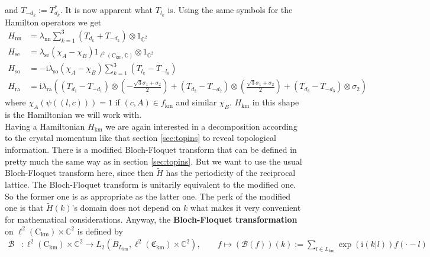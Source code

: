 and $T_{-d_{k}} := T_{d_{k}}^{\ast}$. It is now apparent what $T_{l_{k}}$ is. Using the same symbols for the Hamilton operators we get
\begin{align*}
  H_{\textrm{nn}}
  &=
  \lambda_{\textrm{nn}}
  \sum_{k=1}^{3}
  \left(
    T_{d_{k}}
    +
    T_{-d_{k}}
  \right)
  \otimes
  1_{\mathbb{C}^{2}}
  \\
  H_{\textrm{se}}
  &=
  \lambda_{\textrm{se}}
  (\chi_{A} - \chi_{B})
  1_{\ell^{2}(\mathrm{C}_{\textrm{km}},\mathbb{C})}
  \otimes
  1_{\mathbb{C}^{2}}
  \\
  H_{\textrm{so}}
  &=
  -
  \mathrm{i}
  \lambda_{\textrm{so}}
  (\chi_{A} - \chi_{B})
  \sum_{k=1}^{3}
  \left(
    T_{l_{k}}
    -
    T_{-l_{k}}
  \right)
  \\
  H_{\textrm{ra}}
  &=
  \mathrm{i}
  \lambda_{\textrm{ra}}
  \left(
    \left(
      T_{d_{1}}
      -
      T_{-d_{1}}
    \right)
    \otimes
    \left(
      -
      \frac{\sqrt{3}\sigma_{1} + \sigma_{2}}{2}
    \right)
    +
    \left(
      T_{d_{2}}
      -
      T_{-d_{2}}
    \right)
    \otimes
    \left(
      \frac{\sqrt{3}\sigma_{1} + \sigma_{2}}{2}
    \right)
    +
    \left(
      T_{d_{3}}
      -
      T_{-d_{3}}
    \right)
    \otimes
    \sigma_{2}
  \right)
\end{align*}
where $\chi_{A}(\psi((l,c))) = 1$ if $(c,A) \in f_{\textrm{km}}$ and similar $\chi_{B}$. $H_{\textrm{km}}$ in this shape is the Hamiltonian we will work with. 
\\
Having a Hamiltonian $H_{\textrm{km}}$ we are again interested in a decomposition according to the crystal momentum like that section \ref{sec:topins} to reveal topological information. There is a modified Bloch-Floquet transform that can be defined in pretty much the same way as in section \ref{sec:topins}. But we want to use the usual Bloch-Floquet transform here, since then $\tilde{H}$ has the periodicity of the reciprocal lattice. The Bloch-Floquet transform is unitarily equivalent to the modified one. So the former one is as appropriate as the latter one. The perk of the modified one is that $\tilde{H}(k)$'s domain does not depend on $k$ what makes it very convenient for mathematical considerations. Anyway, the \textbf{Bloch-Floquet transformation} on $\ell^{2}(\mathrm{C}_{\textrm{km}}) \times \mathbb{C}^{2}$ is defined by
\begin{align*}
  \mathcal{B}
  &\colon
  \ell^{2}(\mathrm{C}_{\textrm{km}})
  \times
  \mathbb{C}^{2}
  \to
  L_{2}
  \left(
    B_{L_{\textrm{km}}},
    \ell^{2}(\mathfrak{C}_{\textrm{km}}) 
    \times
    \mathbb{C}^{2}
  \right)
  ,\qquad
  f
  \mapsto
  (\mathcal{B}(f))(k)
  :=
  \sum_{l \in L_{\textrm{km}}}
  \exp(\mathrm{i}(k \vert l))
  f(\cdot - l)
\end{align*}
